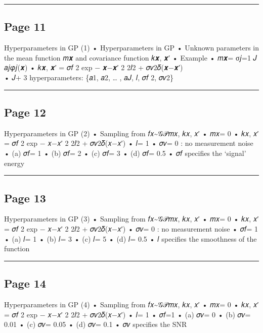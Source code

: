 \documentclass[
]{article}
\begin{document}
\begin{center}\rule{0.5\linewidth}{0.5pt}\end{center}

\subsection{Page 11}\label{page-11}

Hyperparameters in GP (1) • Hyperparameters in GP • Unknown parameters
in the mean function 𝑚𝒙 and covariance function 𝑘𝒙, 𝒙′ • Example • 𝑚𝒙=
σ𝑗=1 𝐽 𝑎𝑗𝜑𝑗(𝒙) • 𝑘𝒙, 𝒙′ = 𝜎𝑓 2 exp − 𝒙−𝒙′ 2 2𝑙2 + 𝜎𝑣2𝛿(𝒙−𝒙′)\\
• 𝐽+ 3 hyperparameters: \{𝑎1, 𝑎2, \ldots{} , 𝑎𝐽, 𝑙, 𝜎𝑓 2, 𝜎𝑣2\}

\begin{center}\rule{0.5\linewidth}{0.5pt}\end{center}

\subsection{Page 12}\label{page-12}

Hyperparameters in GP (2) • Sampling from 𝑓𝑥\textasciitilde 𝒢𝒫𝑚𝑥, 𝑘𝑥, 𝑥′
• 𝑚𝑥= 0 • 𝑘𝑥, 𝑥′ = 𝜎𝑓 2 exp − 𝑥−𝑥′ 2 2𝑙2 + 𝜎𝑣2𝛿(𝑥−𝑥′) • 𝑙= 1 • 𝜎𝑣= 0 :
no measurement noise • (a) 𝜎𝑓= 1 • (b) 𝜎𝑓= 2 • (c) 𝜎𝑓= 3 • (d) 𝜎𝑓= 0.5 •
𝜎𝑓 specifies the `signal' energy

\begin{center}\rule{0.5\linewidth}{0.5pt}\end{center}

\subsection{Page 13}\label{page-13}

Hyperparameters in GP (3) • Sampling from 𝑓𝑥\textasciitilde 𝒢𝒫𝑚𝑥, 𝑘𝑥, 𝑥′
• 𝑚𝑥= 0 • 𝑘𝑥, 𝑥′ = 𝜎𝑓 2 exp − 𝑥−𝑥′ 2 2𝑙2 + 𝜎𝑣2𝛿(𝑥−𝑥′) • 𝜎𝑣= 0 : no
measurement noise • 𝜎𝑓= 1 • (a) 𝑙= 1 • (b) 𝑙= 3 • (c) 𝑙= 5 • (d) 𝑙= 0.5
• 𝑙 specifies the smoothness of the function

\begin{center}\rule{0.5\linewidth}{0.5pt}\end{center}

\subsection{Page 14}\label{page-14}

Hyperparameters in GP (4) • Sampling from 𝑓𝑥\textasciitilde 𝒢𝒫𝑚𝑥, 𝑘𝑥, 𝑥′
• 𝑚𝑥= 0 • 𝑘𝑥, 𝑥′ = 𝜎𝑓 2 exp − 𝑥−𝑥′ 2 2𝑙2 + 𝜎𝑣2𝛿(𝑥−𝑥′) • 𝑙= 1 • 𝜎𝑓=1 •
(a) 𝜎𝑣= 0 • (b) 𝜎𝑣= 0.01 • (c) 𝜎𝑣= 0.05 • (d) 𝜎𝑣= 0.1 • 𝜎𝑣 specifies the
SNR
\end{document}
